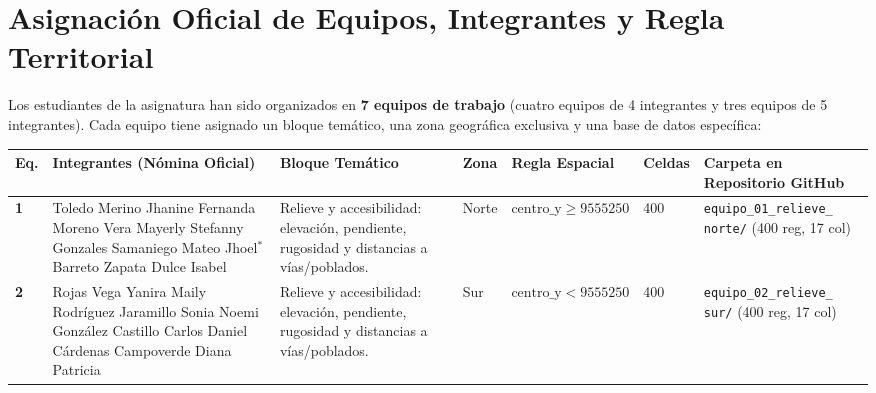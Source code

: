 \documentclass[11pt,a4paper]{article}
\begin{document}
\section{Asignación Oficial de Equipos, Integrantes y Regla Territorial}

Los estudiantes de la asignatura han sido organizados en \textbf{7 equipos de trabajo} (cuatro equipos de 4 integrantes y tres equipos de 5 integrantes). Cada equipo tiene asignado un bloque temático, una zona geográfica exclusiva y una base de datos específica:

\begin{table}[h!]
\centering
\scriptsize
\renewcommand{\arraystretch}{1.03}
\begin{tabularx}{\textwidth}{C{0.8cm} L{3.5cm} L{3.3cm} C{1.1cm} C{1.8cm} C{1.1cm} Y}
\toprule
\textbf{Eq.} & \textbf{Integrantes (Nómina Oficial)} & \textbf{Bloque Temático} & \textbf{Zona} & \textbf{Regla Espacial} & \textbf{Celdas} & \textbf{Carpeta en Repositorio GitHub} \\
\midrule
\textbf{1} & 
\textbullet{} Toledo Merino Jhanine Fernanda\newline
\textbullet{} Moreno Vera Mayerly Stefanny\newline
\textbullet{} Gonzales Samaniego Mateo Jhoel$^{*}$\newline
\textbullet{} Barreto Zapata Dulce Isabel & 
Relieve y accesibilidad: elevación, pendiente, rugosidad y distancias a vías/poblados. & 
Norte & 
$\text{centro\_y} \ge 9555250$ & 
400 & 
\texttt{equipo\_01\_relieve\_} \newline \texttt{norte/} \newline (400 reg, 17 col) \\
\midrule
\textbf{2} & 
\textbullet{} Rojas Vega Yanira Maily\newline
\textbullet{} Rodríguez Jaramillo Sonia Noemi\newline
\textbullet{} González Castillo Carlos Daniel\newline
\textbullet{} Cárdenas Campoverde Diana Patricia & 
Relieve y accesibilidad: elevación, pendiente, rugosidad y distancias a vías/poblados. & 
Sur & 
$\text{centro\_y} < 9555250$ & 
400 & 
\texttt{equipo\_02\_relieve\_} \newline \texttt{sur/} \newline (400 reg, 17 col) \\

\end{tabularx}
\end{table}
\end{document}
